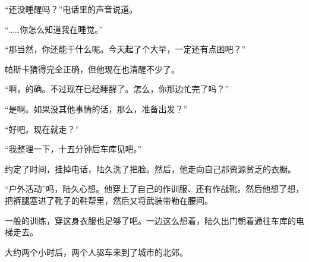 “还没睡醒吗？”电话里的声音说道。

“……你怎么知道我在睡觉。”

“那当然，你还能干什么呢。今天起了个大早，一定还有点困吧？”

帕斯卡猜得完全正确，但他现在也清醒不少了。

“啊，的确。不过现在已经睡醒了。怎么，你那边忙完了吗？”

“是啊。如果没其他事情的话，那么，准备出发？”

“好吧。现在就走？”

“我整理一下，十五分钟后车库见吧。”

约定了时间，挂掉电话，陆久洗了把脸。然后，他走向自己那资源贫乏的衣橱。

“户外活动”吗，陆久心想。他穿上了自己的作训服、还有作战靴。然后他想了想，把裤腿塞进了靴子的鞋帮里，然后又将武装带勒在腰间。

一般的训练，穿这身衣服也足够了吧。一边这么想着，陆久出门朝着通往车库的电梯走去。

大约两个小时后，两个人驱车来到了城市的北郊。

